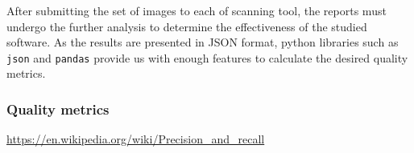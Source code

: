After submitting the set of images to each of scanning tool, the reports must undergo the further analysis to determine the effectiveness of the studied software. As the results are presented in JSON format, python libraries such as \texttt{json} and \texttt{pandas} provide us with enough features to calculate the desired quality metrics. 

\subsubsection*{Quality metrics}



\url{https://en.wikipedia.org/wiki/Precision_and_recall}